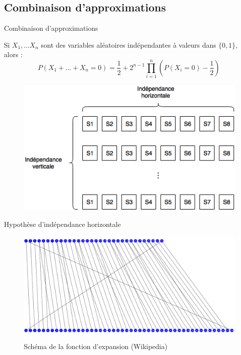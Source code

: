 \documentclass{beamer}
\begin{document}
\subsection{Combinaison d'approximations}
\begin{frame}{Combinaison d'approximations}
\begin{lemma}[Piling-Up]
	Si $X_1, \ldots X_n$ sont des variables aléatoires indépendantes à valeurs dans $\{0,1\}$, alors :
$$P(X_1 + \ldots + X_n=0)=\frac{1}{2}+2^{n-1}\prod_{i=1}^n \left(P(X_i=0)-\frac{1}{2}\right)$$
\end{lemma}

	\begin{figure}
		\centering
		\includegraphics[scale=0.5]{indep}
	\end{figure}
\end{frame}

\begin{frame}{Hypothèse d'indépendance horizontale}
\begin{figure}[H]
	\centering
	\includegraphics[scale=0.25]{exp}

	Schéma de la fonction d'expansion (Wikipedia)
\end{figure}
\end{frame}
\end{document}
